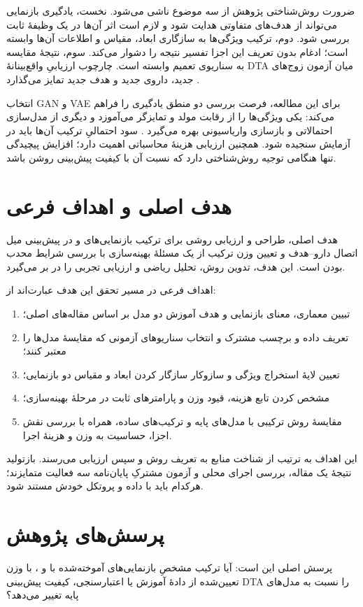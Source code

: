 ضرورت روش‌شناختی پژوهش از سه موضوع ناشی می‌شود. نخست، یادگیری بازنمایی می‌تواند از هدف‌های متفاوتی هدایت شود و لازم است اثر آن‌ها در یک وظیفهٔ ثابت بررسی شود. دوم، ترکیب ویژگی‌ها به سازگاری ابعاد، مقیاس و اطلاعات آن‌ها وابسته است؛ ادغام بدون تعریف این اجزا تفسیر نتیجه را دشوار می‌کند. سوم، نتیجهٔ مقایسه به سناریوی تعمیم وابسته است. چارچوب ارزیابیِ واقع‌بینانهٔ DTA میان آزمون زوج‌های جدید، داروی جدید و هدف جدید تمایز می‌گذارد \cite{Pahikkala15RealisticDTA}.

انتخاب GAN و VAE برای این مطالعه، فرصت بررسی دو منطق یادگیری را فراهم می‌کند: یکی ویژگی‌ها را از رقابت مولد و تمایزگر می‌آموزد و دیگری از مدل‌سازی احتمالاتی و بازسازی واریاسیونی بهره می‌گیرد \cite{Goodfellow14GAN,Kingma14VAE}. سود احتمالیِ ترکیب آن‌ها باید در آزمایش سنجیده شود. همچنین ارزیابی هزینهٔ محاسباتی اهمیت دارد؛ افزایش پیچیدگی تنها هنگامی توجیه روش‌شناختی دارد که نسبت آن با کیفیت پیش‌بینی روشن باشد.

\section{هدف اصلی و اهداف فرعی}
\label{sec:ahdaf}
هدف اصلی، طراحی و ارزیابی روشی برای ترکیب بازنمایی‌های  و  در پیش‌بینی میل اتصال دارو--هدف و تعیین وزن ترکیب از یک مسئلهٔ بهینه‌سازی با بررسی شرایط محدب بودن است. این هدف، تدوین روش، تحلیل ریاضی و ارزیابی تجربی را در بر می‌گیرد.

اهداف فرعی در مسیر تحقق این هدف عبارت‌اند از:
\begin{enumerate}
\item تبیین معماری، معنای بازنمایی و هدف آموزش دو مدل بر اساس مقاله‌های اصلی؛
\item تعریف داده و برچسب مشترک و انتخاب سناریوهای آزمونی که مقایسهٔ مدل‌ها را معتبر کنند؛
\item تعیین لایهٔ استخراج ویژگی و سازوکار سازگار کردن ابعاد و مقیاس دو بازنمایی؛
\item مشخص کردن تابع هزینه، قیود وزن و پارامترهای ثابت در مرحلهٔ بهینه‌سازی؛
\item مقایسهٔ روش ترکیبی با مدل‌های پایه و ترکیب‌های ساده، همراه با بررسی نقش اجزا، حساسیت به وزن و هزینهٔ اجرا.
\end{enumerate}
این اهداف به ترتیب از شناخت منابع به تعریف روش و سپس ارزیابی می‌رسند. بازتولید نتیجهٔ یک مقاله، بررسی اجرای محلی و آزمون مشترکِ پایان‌نامه سه فعالیت متمایزند؛ هرکدام باید با داده و پروتکل خودش مستند شود.

\section{پرسش‌های پژوهش}
\label{sec:porseshha}
پرسش اصلی این است: آیا ترکیب مشخصِ بازنمایی‌های آموخته‌شده با  و ، با وزن تعیین‌شده از دادهٔ آموزش یا اعتبارسنجی، کیفیت پیش‌بینی DTA را نسبت به مدل‌های پایه تغییر می‌دهد؟

